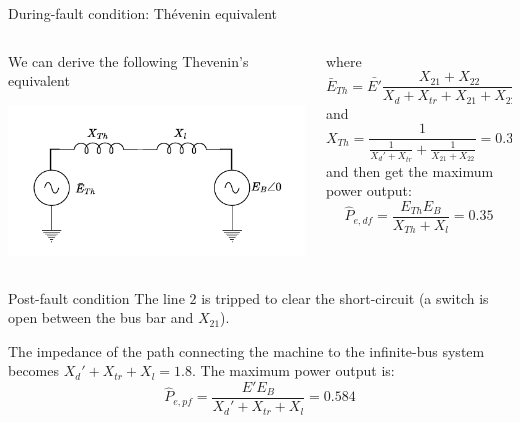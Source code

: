 \begin{frame}{During-fault condition: Thévenin equivalent}
    \begin{columns}
    \begin{column}{0.45\textwidth}
        We can derive the following Thevenin's equivalent
        \begin{center}
        \includegraphics[width=\textwidth]{images/TheveninEquiv.pdf}
        \end{center}
    \end{column}
    \begin{column}{0.55\textwidth}
        where
        $$\bar{E}_{Th} = \bar{E'} \frac{X_{21} + X_{22}}{X_{d}+X_{tr} + X_{21} + X_{22}} = 0.478 e^{j 38.206/180}$$
        and
        $$X_{Th} = \frac{1}{\frac{1}{X_d' + X_{tr}}+\frac{1}{X_{21}+X_{22}}} = 0.364$$
        and then get the maximum power output:
        $$\hat{P}_{e,df} = \frac{E_{Th}E_{B}}{X_{Th} + X_{l}} = 0.35$$
    \end{column}
\end{columns}
\end{frame}

\begin{frame}{Post-fault condition}
The line $2$ is tripped to clear the short-circuit (a switch is open between the bus bar and $X_{21}$).

The impedance of the path connecting the machine to the infinite-bus system becomes $X_d' + X_{tr} + X_{l} = 1.8$.
The maximum power output is:
$$\hat{P}_{e,pf} = \frac{E'E_{B}}{X_d' + X_{tr} + X_{l}} = 0.584$$
\end{frame}

